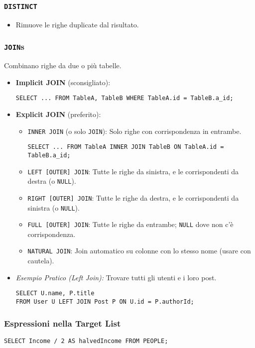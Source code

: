 \subsubsection{\texttt{DISTINCT}}
\begin{itemize}
	\item Rimuove le righe duplicate dal risultato.
\end{itemize}

\subsubsection{\texttt{JOIN}s}
Combinano righe da due o più tabelle.
\begin{itemize}
	\item \textbf{Implicit JOIN} (sconsigliato):
	\begin{verbatim}
SELECT ... FROM TableA, TableB WHERE TableA.id = TableB.a_id;
	\end{verbatim}
	\item \textbf{Explicit JOIN} (preferito):
	\begin{itemize}
		\item \texttt{INNER JOIN} (o solo \texttt{JOIN}): Solo righe con corrispondenza in entrambe.
		\begin{verbatim}
SELECT ... FROM TableA INNER JOIN TableB ON TableA.id = TableB.a_id;
		\end{verbatim}
		\item \texttt{LEFT [OUTER] JOIN}: Tutte le righe da sinistra, e le corrispondenti da destra (o \texttt{NULL}).
		\item \texttt{RIGHT [OUTER] JOIN}: Tutte le righe da destra, e le corrispondenti da sinistra (o \texttt{NULL}).
		\item \texttt{FULL [OUTER] JOIN}: Tutte le righe da entrambe; \texttt{NULL} dove non c'è corrispondenza.
		\item \texttt{NATURAL JOIN}: Join automatico su colonne con lo stesso nome (usare con cautela).
	\end{itemize}
	\item \textit{Esempio Pratico (Left Join):} Trovare tutti gli utenti e i loro post.
	\begin{verbatim}
SELECT U.name, P.title
FROM User U LEFT JOIN Post P ON U.id = P.authorId;
	\end{verbatim}
\end{itemize}

\subsubsection{Espressioni nella Target List}
\begin{verbatim}
SELECT Income / 2 AS halvedIncome FROM PEOPLE;
\end{verbatim}


